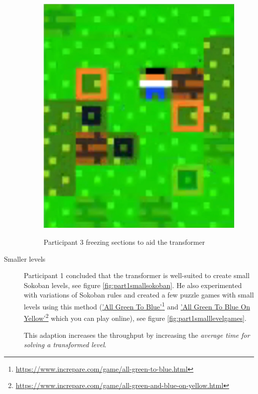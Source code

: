 \begin{description}
\begin{figure}
\begin{minipage}[t]{0.3\textwidth}
\includegraphics[width=\textwidth]{figures/part3helpalittleto.png} \\
\end{minipage}
\caption{Participant 3 freezing sections to aid the transformer\label{fig:part3shelp}}
\end{figure}

    
    \item[Smaller levels] Participant 1 concluded that the transformer is well-suited to create small Sokoban levels, see figure \ref{fig:part1smallsokoban}. He also experimented with variations of Sokoban rules and created a few puzzle games with small levels using this method (\href{https://www.increpare.com/game/all-green-to-blue.html}{'All Green To Blue'}\footnote{\url{https://www.increpare.com/game/all-green-to-blue.html}} and \href{https://www.increpare.com/game/all-green-and-blue-on-yellow.html}{'All Green To Blue On Yellow'}\footnote{\url{https://www.increpare.com/game/all-green-and-blue-on-yellow.html}} which you can play online), see figure \ref{fig:part1smalllevelgames}.
    
    This adaption increases the throughput by increasing the \textit{average time for solving a transformed level}.
    

\end{description}

